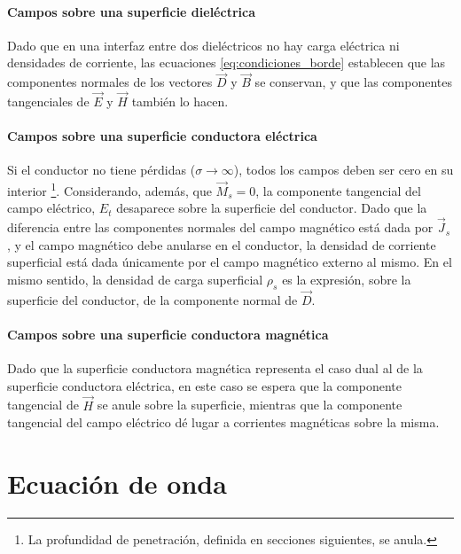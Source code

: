 \paragraph{Campos sobre una superficie dieléctrica}
Dado que en una interfaz entre dos dieléctricos no hay carga eléctrica ni densidades de corriente, las ecuaciones \ref{eq:condiciones_borde} establecen que las componentes normales de los vectores $\vec{D}$ y $\vec{B}$ se conservan, y que las componentes tangenciales de $\vec{E}$ y $\vec{H}$ también lo hacen.

\paragraph{Campos sobre una superficie conductora eléctrica}
Si el conductor no tiene pérdidas ($\sigma \rightarrow \infty$), todos los campos deben ser cero en su interior \footnote{La profundidad de penetración, definida en secciones siguientes, se anula.}. Considerando, además, que $\vec{M}_s = 0$, la componente tangencial del campo eléctrico, $E_t$ desaparece sobre la superficie del conductor. Dado que la diferencia entre las componentes normales del campo magnético está dada por $\vec{J}_s$, y el campo magnético debe anularse en el conductor, la densidad de corriente superficial está dada únicamente por el campo magnético externo al mismo. En el mismo sentido, la densidad de carga superficial $\rho_s$ es la expresión, sobre la superficie del conductor, de la componente normal de $\vec{D}$.


\paragraph{Campos sobre una superficie conductora magnética}
Dado que la superficie conductora magnética representa el caso dual al de la superficie conductora eléctrica, en este caso se espera que la componente tangencial de $\vec{H}$ se anule sobre la superficie, mientras que la componente tangencial del campo eléctrico dé lugar a corrientes magnéticas sobre la misma.


\section{Ecuación de onda}
\label{subsec_eq_de_onda}

